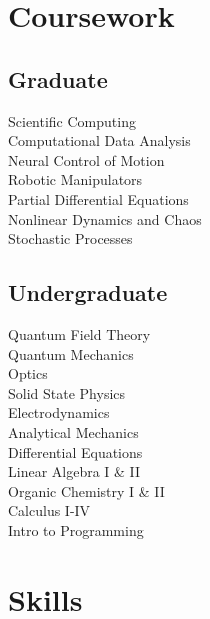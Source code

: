 \documentclass[letterpaper]{deedy-resume} %
\begin{document}
\begin{minipage}[t]{0.33\textwidth}
\sectionspace %


\section{Coursework}

\subsection{Graduate}

Scientific Computing \\
Computational Data Analysis \\
Neural Control of Motion \\
Robotic Manipulators \\
Partial Differential Equations \\
Nonlinear Dynamics and Chaos \\
Stochastic Processes \\


\sectionspace %


\subsection{Undergraduate}
Quantum Field Theory \\
Quantum Mechanics \\
Optics \\
Solid State Physics \\
Electrodynamics \\
Analytical Mechanics \\
Differential Equations \\
Linear Algebra I \& II \\
Organic Chemistry I \& II \\
Calculus I-IV \\
Intro to Programming \\
\sectionspace %


\section{Skills}


\end{minipage}
\end{document}
